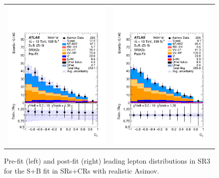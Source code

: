 \begin{figure}[htbp]
	\centering
	\begin{tabular}{cc}
		\includegraphics[width=.45\textwidth]{Appendices/AP8/figures/SPLUSB_CRSR_UsingSMTFullSys/Plots/SR3} &
		\includegraphics[width=.45\textwidth]{Appendices/AP8/figures/SPLUSB_CRSR_UsingSMTFullSys/Plots/SR3_postFit} \\
	\end{tabular}
	\caption{Pre-fit (left) and post-fit (right) leading lepton \pt distributions in SR3 for the S+B \tZc fit in SRs+CRs with realistic Asimov.
		\ErrStatSys
	}%
	\label{fig:stat_smt:tzc:splusb:crsr:srplots:2}
\end{figure}

